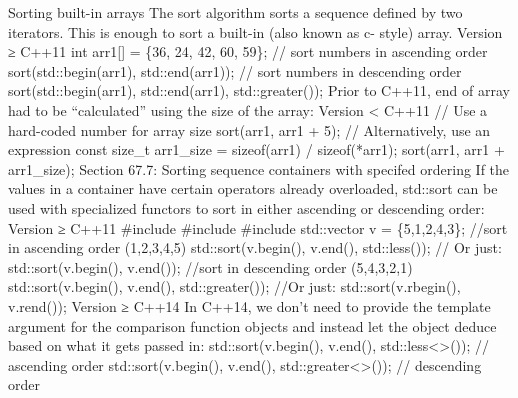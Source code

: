 Sorting built-in arrays The sort algorithm sorts a sequence deﬁned by
two iterators. This is enough to sort a built-in (also known as c-
style) array. Version ≥ C++11 int arr1{[}{]} = \{36, 24, 42, 60, 59\};
// sort numbers in ascending order sort(std::begin(arr1),
std::end(arr1)); // sort numbers in descending order
sort(std::begin(arr1), std::end(arr1), std::greater()); Prior to C++11,
end of array had to be ``calculated'' using the size of the array:
Version \textless{} C++11 // Use a hard-coded number for array size
sort(arr1, arr1 + 5); // Alternatively, use an expression const size\_t
arr1\_size = sizeof(arr1) / sizeof(*arr1); sort(arr1, arr1 +
arr1\_size); Section 67.7: Sorting sequence containers with specifed
ordering If the values in a container have certain operators already
overloaded, std::sort can be used with specialized functors to sort in
either ascending or descending order: Version ≥ C++11 \#include
\#include \#include std::vector v = \{5,1,2,4,3\}; //sort in ascending
order (1,2,3,4,5) std::sort(v.begin(), v.end(), std::less()); // Or
just: std::sort(v.begin(), v.end()); //sort in descending order
(5,4,3,2,1) std::sort(v.begin(), v.end(), std::greater()); //Or just:
std::sort(v.rbegin(), v.rend()); Version ≥ C++14 In C++14, we don't need
to provide the template argument for the comparison function objects and
instead let the object deduce based on what it gets passed in:
std::sort(v.begin(), v.end(), std::less\textless\textgreater()); //
ascending order std::sort(v.begin(), v.end(),
std::greater\textless\textgreater()); // descending order
